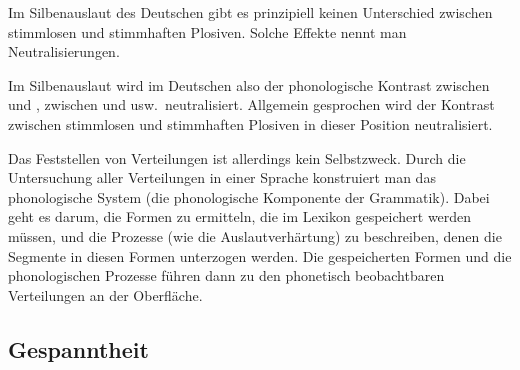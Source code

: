 \begin{exe}
  \ex\label{ex:phol-5674-1}
  \begin{xlist}
  \end{xlist}
  \ex\label{ex:phol-5674-2}
  \begin{xlist}
  \end{xlist}
  \ex\label{ex:phol-5674-3}
  \begin{xlist}
  \end{xlist}
\end{exe}

Im Silbenauslaut des Deutschen gibt es prinzipiell keinen Unterschied zwischen stimmlosen und stimmhaften Plosiven.
Solche Effekte nennt man Neutralisierungen.


Im Silbenauslaut wird im Deutschen also der phonologische Kontrast zwischen \textipa{[g]} und \textipa{[k]}, zwischen \textipa{[d]} und \textipa{[t]} usw.\ neutralisiert.
Allgemein gesprochen wird der Kontrast zwischen stimmlosen und stimmhaften Plosiven in dieser Position neutralisiert.

Das Feststellen von Verteilungen ist allerdings kein Selbstzweck.
Durch die Untersuchung aller Verteilungen in einer Sprache konstruiert man das phonologische System (die phonologische Komponente der Grammatik).
Dabei geht es darum, die Formen zu ermitteln, die im Lexikon gespeichert werden müssen, und die Prozesse (wie die Auslautverhärtung) zu beschreiben, denen die Segmente in diesen Formen unterzogen werden.
Die gespeicherten Formen und die phonologischen Prozesse führen dann zu den phonetisch beobachtbaren Verteilungen an der Oberfläche.

\subsection{Gespanntheit}

\label{sec:gespanntheit}

